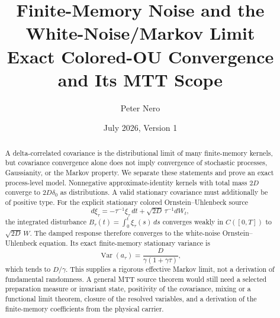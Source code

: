 \documentclass[11pt]{article}
\title{Finite-Memory Noise and the White-Noise/Markov Limit\\
\large Exact Colored-OU Convergence and Its MTT Scope}
\author{Peter Nero}
\date{July 2026, Version 1}
\newcommand{\Var}{\operatorname{Var}}
\begin{document}
\maketitle

\begin{abstract}
A delta-correlated covariance is the distributional limit of many
finite-memory kernels, but covariance convergence alone does not imply
convergence of stochastic processes, Gaussianity, or the Markov property. We
separate these statements and prove an exact process-level model. Nonnegative
approximate-identity kernels with total mass \(2D\) converge to
\(2D\delta_0\) as distributions. A valid stationary covariance must
additionally be of positive type. For the explicit stationary colored
Ornstein--Uhlenbeck source
\[
d\xi_\tau=-\tau^{-1}\xi_\tau\,dt
 +\sqrt{2D}\,\tau^{-1}dW_t,
\]
the integrated disturbance
\(B_\tau(t)=\int_0^t\xi_\tau(s)\,ds\) converges weakly in
\(C([0,T])\) to \(\sqrt{2D}\,W\). The damped response therefore converges to
the white-noise Ornstein--Uhlenbeck equation. Its exact finite-memory
stationary variance is
\[
\Var(a_\tau)=\frac{D}{\gamma(1+\gamma\tau)},
\]
which tends to \(D/\gamma\). This supplies a rigorous effective Markov limit,
not a derivation of fundamental randomness. A general MTT source theorem
would still need a selected preparation measure or invariant state, positivity
of the covariance, mixing or a functional limit theorem, closure of the
resolved variables, and a derivation of the finite-memory coefficients from
the physical carrier.
\end{abstract}
\end{document}
